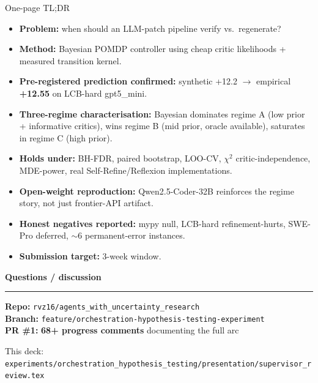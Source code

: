 \documentclass[10pt]{beamer}
\newcommand{\good}[1]{\textcolor{accentGreen}{\textbf{#1}}}
\newcommand{\warn}[1]{\textcolor{accentOrange}{\textbf{#1}}}
\newcommand{\info}[1]{\textcolor{primaryBlue}{\textbf{#1}}}
\begin{document}
\begin{frame}{One-page TL;DR}
\vspace{0.2cm}
\begin{itemize}
\item \info{Problem:} when should an LLM-patch pipeline verify vs.\ regenerate?
\item \info{Method:} Bayesian POMDP controller using cheap critic likelihoods
  + measured transition kernel.
\item \good{Pre-registered prediction confirmed:} synthetic +12.2 $\to$
  empirical \good{+12.55} on LCB-hard gpt5\_mini.
\item \info{Three-regime characterisation:} Bayesian dominates regime A
  (low prior + informative critics), wins regime B (mid prior, oracle
  available), saturates in regime C (high prior).
\item \info{Holds under:} BH-FDR, paired bootstrap, LOO-CV, $\chi^2$
  critic-independence, MDE-power, real Self-Refine/Reflexion implementations.
\item \good{Open-weight reproduction:} Qwen2.5-Coder-32B reinforces the
  regime story, not just frontier-API artifact.
\item \warn{Honest negatives reported:} mypy null, LCB-hard refinement-hurts,
  SWE-Pro deferred, ${\sim}6$ permanent-error instances.
\item \info{Submission target:} 3-week window.
\end{itemize}
\end{frame}

\begin{frame}
\vspace{1.5cm}
\centering
{\Huge\textcolor{primaryBlue}{\textbf{Questions / discussion}}}
\vspace{1cm}

\begin{center}
\textcolor{primaryBlue}{\rule{0.6\textwidth}{1pt}}
\end{center}
\vspace{0.5cm}

\normalsize
\info{Repo:} \texttt{rvz16/agents\_with\_uncertainty\_research}\\[0.3em]
\info{Branch:} \texttt{feature/orchestration-hypothesis-testing-experiment}\\[0.3em]
\info{PR \#1:} \good{68+ progress comments} documenting the full arc

\vspace{1cm}
\small\textcolor{softGrey}{
This deck:
\texttt{experiments/orchestration\_hypothesis\_testing/presentation/supervisor\_review.tex}
}
\end{frame}
\end{document}
